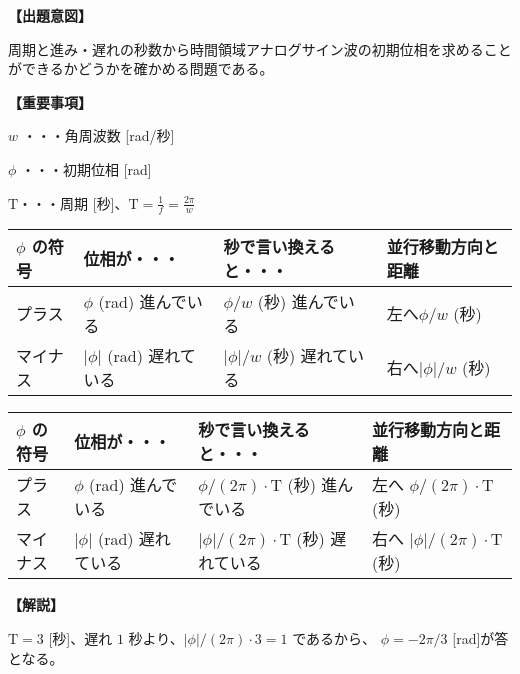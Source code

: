 \noindent \textbf{【出題意図】}

\noindent 周期と進み・遅れの秒数から時間領域アナログサイン波の初期位相を求めることができるかどうかを確かめる問題である。

\vspace{1em}
\noindent \textbf{【重要事項】}

\bigskip
\noindent $w$ ・・・角周波数 [rad/秒]

\bigskip
\noindent $\phi$ ・・・初期位相 [rad]

\bigskip
$\textrm{T}$・・・周期 [秒]、$\textrm{T} = \frac{1}{f} = \frac{2\pi}{w}$

\begin{center}
\begin{tabularx}{0.9\fbwidth}{|X|X|X|X|}
\hline
$\phi$ の符号&  位相が・・・   & 秒で言い換えると・・・   & 並行移動方向と距離 \\
\hline
プラス &  $\phi$ (rad) 進んでいる & $\phi/w$ (秒) 進んでいる & 左へ$\phi/w$ (秒) \\
\hline
マイナス &  $|\phi|$ (rad) 遅れている & $|\phi|/w$ (秒) 遅れている & 右へ$|\phi|/w$ (秒) \\
\hline
\end{tabularx}

\medskip
\begin{tabularx}{0.9\fbwidth}{|X|X|X|X|}
\hline
$\phi$ の符号&  位相が・・・   & 秒で言い換えると・・・   & 並行移動方向と距離 \\
\hline
プラス &  $\phi$ (rad) 進んでいる & $\phi/(2\pi) \cdot \textrm{T}$ (秒) 進んでいる & 左へ $\phi/(2\pi) \cdot \textrm{T}$ (秒) \\
\hline
マイナス &  $|\phi|$ (rad) 遅れている & $|\phi|/(2\pi) \cdot \textrm{T}$ (秒) 遅れている & 右へ $|\phi|/(2\pi) \cdot \textrm{T}$ (秒) \\
\hline
\end{tabularx}
\end{center}

\vspace{1em}
\noindent \textbf{【解説】}

\noindent $\textrm{T} = 3$ [秒]、遅れ $1$ 秒より、$|\phi|/(2\pi) \cdot 3 = 1$ であるから、
$\phi = -2\pi/3$ [rad]が答となる。


